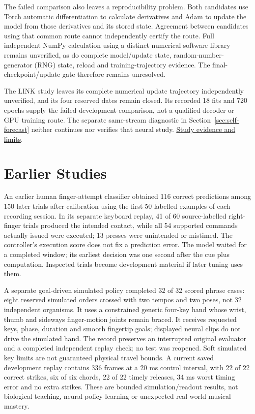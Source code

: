 The failed comparison also leaves a reproducibility problem. Both candidates use Torch automatic differentiation to calculate derivatives and Adam to update the model from those derivatives and its stored state. Agreement between candidates using that common route cannot independently certify the route. Full independent NumPy calculation using a distinct numerical software library remains unverified, as do complete model/update state, random-number-generator (RNG) state, reload and training-trajectory evidence. The final-checkpoint/update gate therefore remains unresolved.\par

The LINK study leaves its complete numerical update trajectory independently unverified, and its four reserved dates remain closed. Its recorded 18 fits and 720 epochs supply the failed development comparison, not a qualified decoder or GPU training route. The separate same-stream diagnostic in Section~\ref{sec:self-forecast} neither continues nor verifies that neural study. \href{research-evidence.json}{Study evidence and limits}.\par

\section{Earlier Studies}

An earlier human finger-attempt classifier obtained 116 correct predictions among 150 later trials after calibration using the first 50 labelled examples of each recording session. In its separate keyboard replay, 41 of 60 source-labelled right-finger trials produced the intended contact, while all 54 supported commands actually issued were executed; 13 presses were unintended or mistimed. The controller's execution score does not fix a prediction error. The model waited for a completed window; its earliest decision was one second after the cue plus computation. Inspected trials become development material if later tuning uses them.\par

A separate goal-driven simulated policy completed 32 of 32 scored phrase cases: eight reserved simulated orders crossed with two tempos and two poses, not 32 independent organisms. It uses a constrained generic four-key hand whose wrist, thumb and sideways finger-motion joints remain braced. It receives requested keys, phase, duration and smooth fingertip goals; displayed neural clips do not drive the simulated hand. The record preserves an interrupted original evaluator and a completed independent replay check; no test was reopened. Soft simulated key limits are not guaranteed physical travel bounds. A current saved development replay contains 336 frames at a 20 ms control interval, with 22 of 22 correct strikes, six of six chords, 22 of 22 timely releases, 34 ms worst timing error and no extra strikes. These are bounded simulation/readout results, not biological teaching, neural policy learning or unexpected real-world musical mastery.\par

